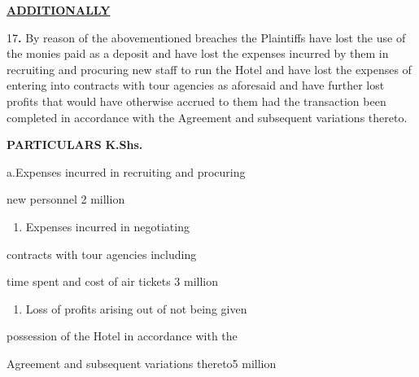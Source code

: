 \documentclass[12pt,a4paper]{article}
\begin{document}
\begin{justify}\uline{\textbf{ADDITIONALLY}}\end{justify}


\begin{justify}17\textbf{. }By reason of the abovementioned breaches the Plaintiffs have lost the use of the monies paid as a deposit and have lost the expenses incurred by them in recruiting and procuring new staff to run the Hotel and have lost the expenses of entering into contracts with tour agencies as aforesaid and have further lost profits that would have otherwise accrued to them had the transaction been completed in accordance with the Agreement and subsequent variations thereto.\end{justify}


\begin{justify}\textbf{PARTICULARS}                       \textbf{K.Shs.}\end{justify}


\begin{justify}    a.Expenses incurred in recruiting and procuring\end{justify}


\begin{justify}new personnel   2 million\end{justify}


\begin{enumerate}
\item Expenses incurred in negotiating 

\end{enumerate}
\begin{justify}contracts with tour agencies including \end{justify}


\begin{justify}time spent and cost of air tickets                                    3 million\end{justify}


\begin{enumerate}
\item Loss of profits arising out of not being given 

\end{enumerate}
\begin{justify}possession of the Hotel in accordance with the\end{justify}


\begin{flushleft} Agreement and subsequent variations thereto5 million\end{flushleft}
\end{document}
